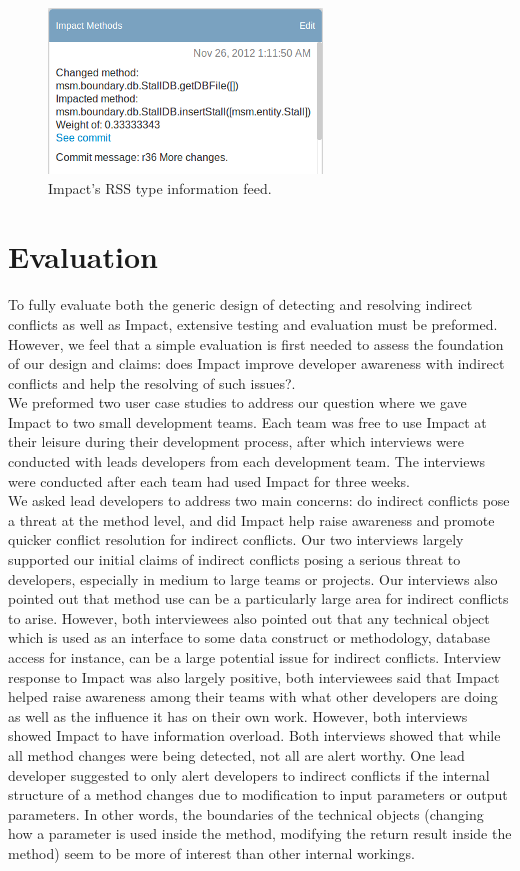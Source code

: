 \documentclass[conference]{IEEEtran}
\begin{document}
\begin{figure}[t!]
\includegraphics{images/ImpactDemo}
\caption{Impact's RSS type information feed.\label{fig:impact}}
\end{figure}


\section{Evaluation}
To fully evaluate both the generic design of detecting and resolving
indirect conflicts as well as Impact, extensive testing and evaluation
must be preformed. However, we feel that a simple evaluation is
first needed to assess the foundation of our design and claims:
does Impact improve developer awareness with indirect conflicts
and help the resolving of such issues?.\\

We preformed two user case studies to address our question where
we gave Impact to two small development teams. Each team was
free to use Impact at their leisure during their development process,
after which interviews were conducted with leads developers from 
each development team. The interviews were conducted after each
team had used Impact for three weeks.\\

We asked lead developers to address two main concerns: do indirect
conflicts pose a threat at the method level, and did Impact help raise
awareness and promote quicker conflict resolution for indirect
conflicts. Our two interviews largely supported our initial claims of
indirect conflicts posing a serious threat to developers, especially
in medium to large teams or projects. Our interviews also pointed
out that method use can be a particularly large area for indirect
conflicts to arise. However, both interviewees also pointed out that
any technical object which is used as an interface to some data
construct or methodology, database access for instance, can be 
a large potential issue for indirect conflicts.  Interview response to
Impact was also largely positive, both interviewees said that Impact
helped raise awareness among their teams with what other developers
are doing as well as the influence it has on their own work. However,
both interviews showed Impact to have information overload. Both
interviews showed that while all method changes were being detected,
not all are alert worthy. One lead developer suggested to only alert
developers to indirect conflicts if the internal structure of a method
changes due to modification to input parameters or output parameters.
In other words, the boundaries of the technical objects (changing
how a parameter is used inside the method, modifying the return
result inside the method) seem to be more of interest than other 
internal workings.\\
\end{document}
